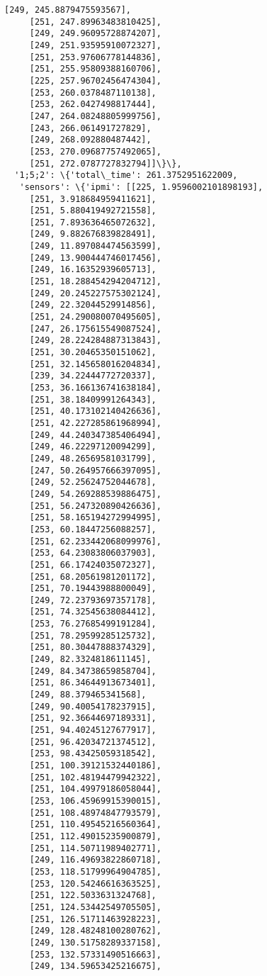 \documentclass[11pt]{article}
\begin{document}
\begin{tcolorbox}[breakable, size=fbox, boxrule=.5pt, pad at break*=1mm, opacityfill=0]
\begin{Verbatim}[commandchars=\\\{\}]
     [249, 245.8879475593567],
     [251, 247.89963483810425],
     [249, 249.96095728874207],
     [249, 251.93595910072327],
     [251, 253.97606778144836],
     [251, 255.95809388160706],
     [225, 257.96702456474304],
     [253, 260.0378487110138],
     [253, 262.0427498817444],
     [247, 264.08248805999756],
     [243, 266.061491727829],
     [249, 268.092880487442],
     [253, 270.09687757492065],
     [251, 272.0787727832794]]\}\},
  '1;5;2': \{'total\_time': 261.3752951622009,
   'sensors': \{'ipmi': [[225, 1.9596002101898193],
     [251, 3.918684959411621],
     [251, 5.880419492721558],
     [251, 7.893636465072632],
     [249, 9.882676839828491],
     [249, 11.897084474563599],
     [249, 13.900444746017456],
     [249, 16.16352939605713],
     [251, 18.288454294204712],
     [249, 20.245227575302124],
     [249, 22.32044529914856],
     [251, 24.290080070495605],
     [247, 26.175615549087524],
     [249, 28.224284887313843],
     [251, 30.20465350151062],
     [251, 32.145658016204834],
     [239, 34.22444772720337],
     [253, 36.166136741638184],
     [251, 38.18409991264343],
     [251, 40.173102140426636],
     [251, 42.227285861968994],
     [249, 44.240347385406494],
     [249, 46.22297120094299],
     [249, 48.26569581031799],
     [247, 50.264957666397095],
     [249, 52.25624752044678],
     [249, 54.269288539886475],
     [251, 56.247320890426636],
     [251, 58.165194272994995],
     [253, 60.18447256088257],
     [251, 62.233442068099976],
     [253, 64.23083806037903],
     [251, 66.17424035072327],
     [251, 68.20561981201172],
     [251, 70.19443988800049],
     [249, 72.23793697357178],
     [251, 74.32545638084412],
     [253, 76.27685499191284],
     [251, 78.29599285125732],
     [251, 80.30447888374329],
     [249, 82.3324818611145],
     [249, 84.34738659858704],
     [251, 86.34644913673401],
     [249, 88.379465341568],
     [249, 90.40054178237915],
     [251, 92.36644697189331],
     [251, 94.40245127677917],
     [251, 96.42034721374512],
     [253, 98.43425059318542],
     [251, 100.39121532440186],
     [251, 102.48194479942322],
     [251, 104.49979186058044],
     [253, 106.45969915390015],
     [251, 108.48974847793579],
     [251, 110.49545216560364],
     [251, 112.49015235900879],
     [251, 114.50711989402771],
     [249, 116.49693822860718],
     [253, 118.51799964904785],
     [253, 120.54246616363525],
     [251, 122.5033631324768],
     [251, 124.53442549705505],
     [251, 126.51711463928223],
     [249, 128.48248100280762],
     [249, 130.51758289337158],
     [253, 132.57331490516663],
     [249, 134.59653425216675],

\end{Verbatim}
\end{tcolorbox}
\end{document}
